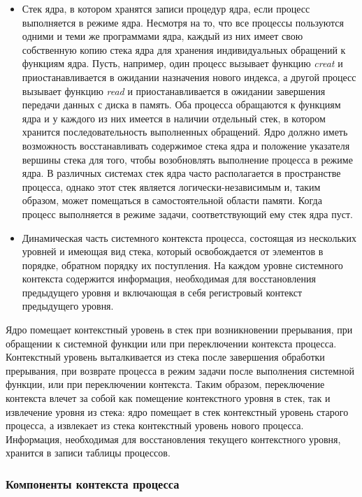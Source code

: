\documentclass[14pt,a4paper,report]{report}
\begin{document}
\begin{itemize}
	\item Стек ядра, в котором хранятся записи процедур ядра, если процесс выполняется в режиме ядра. Несмотря на то, что все процессы пользуются одними и теми же программами ядра, каждый из них имеет свою собственную копию стека ядра для хранения индивидуальных обращений к функциям ядра. Пусть, например, один процесс вызывает функцию \emph{creat} и приостанавливается в ожидании назначения нового индекса, а другой процесс вызывает функцию \emph{read} и приостанавливается в ожидании завершения передачи данных с диска в память. Оба процесса обращаются к функциям ядра и у каждого из них имеется в наличии отдельный стек, в котором хранится последовательность выполненных обращений. Ядро должно иметь возможность восстанавливать содержимое стека ядра и положение указателя вершины стека для того, чтобы возобновлять выполнение процесса в режиме ядра. В различных системах стек ядра часто располагается в пространстве процесса, однако этот стек является логически-независимым и, таким образом, может помещаться в самостоятельной области памяти. Когда процесс выполняется в режиме задачи, соответствующий ему стек ядра пуст.
	\item Динамическая часть системного контекста процесса, состоящая из нескольких уровней и имеющая вид стека, который освобождается от элементов в порядке, обратном порядку их поступления. На каждом уровне системного контекста содержится информация, необходимая для восстановления предыдущего уровня и включающая в себя регистровый контекст предыдущего уровня.
\end{itemize}

Ядро помещает контекстный уровень в стек при возникновении прерывания, при обращении к системной функции или при переключении контекста процесса. Контекстный уровень выталкивается из стека после завершения обработки прерывания, при возврате процесса в режим задачи после выполнения системной функции, или при переключении контекста. Таким образом, переключение контекста влечет за собой как помещение контекстного уровня в стек, так и извлечение уровня из стека: ядро помещает в стек контекстный уровень старого процесса, а извлекает из стека контекстный уровень нового процесса. Информация, необходимая для восстановления текущего контекстного уровня, хранится в записи таблицы процессов.

\subsubsection{Компоненты контекста процесса}
\end{document}
